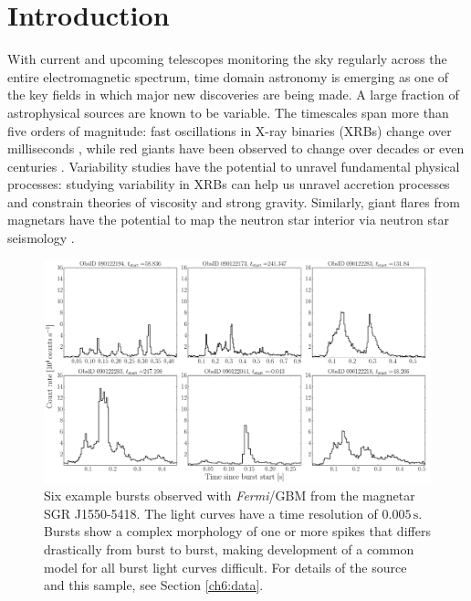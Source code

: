 \documentclass[12pt]{emulateapj}
\newcommand{\project}[1]{\textsl{#1}}
\newcommand{\fermi}{\project{Fermi}}
\begin{document}

\section{Introduction}

With current and upcoming telescopes monitoring the sky regularly across the entire electromagnetic spectrum, time domain astronomy is emerging as one of the key fields in which major 
new discoveries are being made.  A large fraction of astrophysical sources are known to be variable. The timescales span more than five orders of magnitude: fast oscillations in 
X-ray binaries (XRBs) change over milliseconds \citep[e.g.][]{xrb_khzqpos}, while red giants have been observed to change over decades or even centuries \citep[e.g.][]{dasch_giants}. 
Variability studies have the potential to unravel fundamental physical processes: studying variability in XRBs can help us unravel accretion processes and constrain theories of viscosity and strong gravity. 
Similarly, giant flares from magnetars have the potential to map the neutron star interior via neutron star seismology \citep[e.g.\ ][]{steiner2009}. 

\begin{figure}[htbp]
\begin{center}
\includegraphics[width=\textwidth]{f1.pdf}%
\caption{Six example bursts observed with \fermi/GBM from the magnetar SGR J1550-5418. The light curves have a time resolution of $0.005\,\mathrm{s}$. Bursts show a complex morphology of one or more
spikes that differs drastically from burst to burst, making development of a common model for all burst light curves difficult. For details of the source
and this sample, see Section \ref{ch6:data}.}
\label{fig:example_bursts}
\end{center}
\end{figure}
\end{document}
